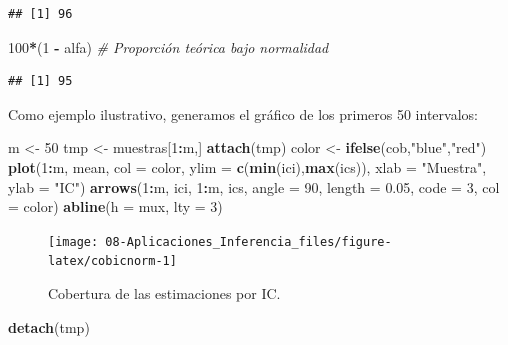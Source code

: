 \documentclass[]{book}
\newenvironment{Shaded}{\begin{snugshade}}{\end{snugshade}}
\newcommand{\KeywordTok}[1]{\textcolor[rgb]{0.13,0.29,0.53}{\textbf{#1}}}
\newcommand{\DataTypeTok}[1]{\textcolor[rgb]{0.13,0.29,0.53}{#1}}
\newcommand{\DecValTok}[1]{\textcolor[rgb]{0.00,0.00,0.81}{#1}}
\newcommand{\FloatTok}[1]{\textcolor[rgb]{0.00,0.00,0.81}{#1}}
\newcommand{\StringTok}[1]{\textcolor[rgb]{0.31,0.60,0.02}{#1}}
\newcommand{\CommentTok}[1]{\textcolor[rgb]{0.56,0.35,0.01}{\textit{#1}}}
\newcommand{\OperatorTok}[1]{\textcolor[rgb]{0.81,0.36,0.00}{\textbf{#1}}}
\newcommand{\NormalTok}[1]{#1}
\theoremstyle{definition}
\theoremstyle{definition}
\theoremstyle{definition}
\theoremstyle{remark}
\begin{document}
\begin{enumerate}
\begin{verbatim}
## [1] 96
\end{verbatim}

\begin{Shaded}
\begin{Highlighting}[]
\DecValTok{100}\OperatorTok{*}\NormalTok{(}\DecValTok{1} \OperatorTok{-}\StringTok{ }\NormalTok{alfa)    }\CommentTok{# Proporción teórica bajo normalidad}
\end{Highlighting}
\end{Shaded}

\begin{verbatim}
## [1] 95
\end{verbatim}

  Como ejemplo ilustrativo, generamos el gráfico de los primeros 50
  intervalos:

\begin{Shaded}
\begin{Highlighting}[]
\NormalTok{m <-}\StringTok{ }\DecValTok{50}
\NormalTok{tmp <-}\StringTok{ }\NormalTok{muestras[}\DecValTok{1}\OperatorTok{:}\NormalTok{m,]}
\KeywordTok{attach}\NormalTok{(tmp)}
\NormalTok{color <-}\StringTok{ }\KeywordTok{ifelse}\NormalTok{(cob,}\StringTok{"blue"}\NormalTok{,}\StringTok{"red"}\NormalTok{)}
\KeywordTok{plot}\NormalTok{(}\DecValTok{1}\OperatorTok{:}\NormalTok{m, mean, }\DataTypeTok{col =}\NormalTok{ color, }\DataTypeTok{ylim =} \KeywordTok{c}\NormalTok{(}\KeywordTok{min}\NormalTok{(ici),}\KeywordTok{max}\NormalTok{(ics)), }
     \DataTypeTok{xlab =} \StringTok{"Muestra"}\NormalTok{, }\DataTypeTok{ylab =} \StringTok{"IC"}\NormalTok{)}
\KeywordTok{arrows}\NormalTok{(}\DecValTok{1}\OperatorTok{:}\NormalTok{m, ici, }\DecValTok{1}\OperatorTok{:}\NormalTok{m, ics, }\DataTypeTok{angle =} \DecValTok{90}\NormalTok{, }\DataTypeTok{length =} \FloatTok{0.05}\NormalTok{, }\DataTypeTok{code =} \DecValTok{3}\NormalTok{, }\DataTypeTok{col =}\NormalTok{ color)}
\KeywordTok{abline}\NormalTok{(}\DataTypeTok{h =}\NormalTok{ mux, }\DataTypeTok{lty =} \DecValTok{3}\NormalTok{)}
\end{Highlighting}
\end{Shaded}

  \begin{figure}[!htb]

  {\centering \texttt{[image: 08-Aplicaciones\_Inferencia\_files/figure-latex/cobicnorm-1]} 

  }

  \caption{Cobertura de las estimaciones por IC.}\label{fig:cobicnorm}
  \end{figure}

\begin{Shaded}
\begin{Highlighting}[]
\KeywordTok{detach}\NormalTok{(tmp)}
\end{Highlighting}
\end{Shaded}
\end{enumerate}
\end{document}
